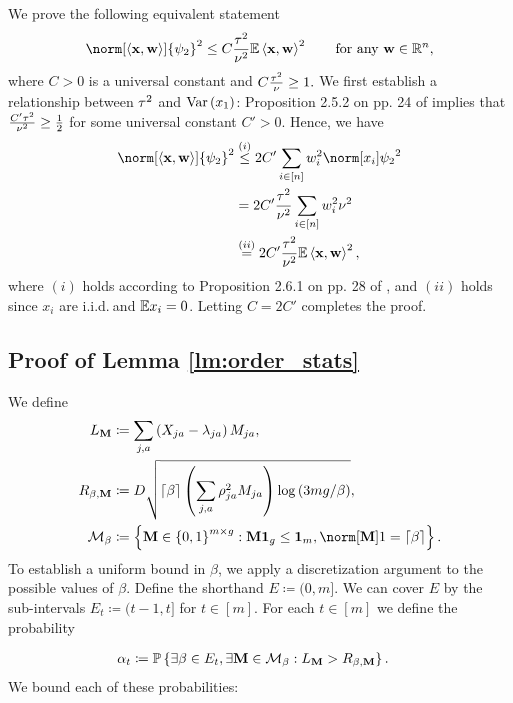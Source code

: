 We prove the following equivalent statement 
\[
\norm[\left\langle \x,\w\right\rangle ]{\psi_{2}}^{2}\leq C\frac{\sgnorm^{2}}{\std^{2}}\E\left\langle \x,\w\right\rangle ^{2}\qquad\text{for any }\w\in\real^{\num},
\]
where $C>0$ is a universal constant and $C\frac{\tau^{2}}{\nu}\ge1.$
We first establish a relationship between $\tau^{2}$ and $\operatorname*{Var}\left(x_{1}\right)$:
Proposition 2.5.2 on pp. 24 of \citet{vershynin2017high} implies
that $\frac{C'\tau^{2}}{\nu^{2}}\ge\frac{1}{2}$ for some universal
constant $C'>0$. Hence, we have 
\begin{align*}
\norm[\left\langle \x,\w\right\rangle ]{\psi_{2}}^{2} & \overset{(i)}{\le}2C'\sum_{i\in\left[\num\right]}w_{i}^{2}\norm[x_{i}]{\psi_{2}}^{2}\\
 & =2C'\frac{\sgnorm^{2}}{\std^{2}}\sum_{i\in\left[\num\right]}w_{i}^{2}\std^{2}\\
 & \overset{(ii)}{=}2C'\frac{\sgnorm^{2}}{\std^{2}}\E\left\langle \x,\w\right\rangle ^{2},
\end{align*}
where $(i)$ holds according to Proposition 2.6.1 on pp. 28 of \citet{vershynin2017high},
and $(ii)$ holds since $x_{i}$ are i.i.d.$\ $and $\mathbb{E} x_{i}=0$.
Letting $C=2C'$ completes the proof.

\subsection{Proof of Lemma \ref{lm:order_stats} \label{sec:proof_lm_order_stat}}

We define 
\begin{align*}
L_{\M} & \coloneqq\sum_{j,a}\left(X_{ja}-\lambda_{ja}\right)M_{ja},\\
R_{\beta,\M} & \coloneqq D\sqrt{\left\lceil \beta\right\rceil \left(\sum_{j,a}\rho_{ja}^{2}M_{ja}\right)\log\left(3mg/\beta\right)},\\
\calM_{\beta} & \coloneqq\left\{ \M\in\left\{ 0,1\right\} ^{m\times g}:\M\one_{g}\le\one_{m},\norm[\M]1=\left\lceil \beta\right\rceil \right\} .
\end{align*}
To establish a uniform bound in $\beta$, we apply a discretization
argument to the possible values of $\beta$. Define the shorthand
$E\coloneqq(0,m]$. We can cover $E$ by the sub-intervals $E_{t}\coloneqq(t-1,t]$
for $t\in[m]$. For each $t\in[m]$ we define the probability

\begin{align*}
\alpha_{t} & \coloneqq\mathbb{P}\left\{ \exists\beta\in E_{t},\exists\mathbf{M}\in\mathcal{M}_{\beta}:L_{\mathbf{M}}>R_{\beta,\mathbf{M}}\right\} .
\end{align*}
We bound each of these probabilities: 

